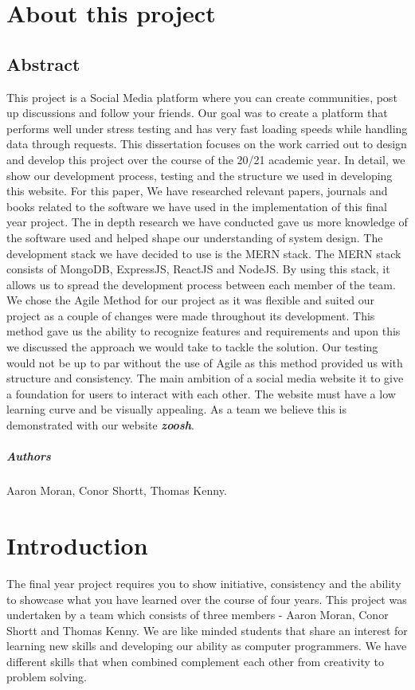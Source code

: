 
\chapter*{About this project}
\section{Abstract}
This project is a Social Media platform where you can create communities, post up discussions and follow your friends. Our goal was to create a platform that performs well under stress testing and has very fast loading speeds while handling data through requests.
This dissertation focuses on the work carried out to design and develop this project over the course of the 20/21 academic year. In detail, we show our development process, testing and the structure we used in developing this website. For this paper, We have researched relevant papers, journals and books related to the software we have used in the implementation of this final year project. The in depth research we have conducted gave us more knowledge of the software used and helped shape our understanding of system design. The development stack we have decided to use is the MERN stack. The MERN stack consists of MongoDB, ExpressJS, ReactJS and NodeJS. By using this stack, it allows us to spread the development process between each member of the team. We chose the Agile Method for our project as it was flexible and suited our project as a couple of changes were made throughout its development. This method gave us the ability to recognize features and requirements and upon this we discussed the approach we would take to tackle the solution. Our testing would not be up to par without the use of Agile as this method provided us with structure and consistency. 
The main ambition of a social media website it to give a foundation for users to interact with each other. The website must have a low learning curve and be visually appealing. As a team we believe this is demonstrated with our website \textbf{\textit{zoosh}}.

\paragraph{Authors}
Aaron Moran, Conor Shortt, Thomas Kenny.

\chapter{Introduction}
The final year project requires you to show initiative, consistency and the ability to showcase what you have learned over the course of four years.
This project was undertaken by a team which consists of three members - Aaron Moran, Conor Shortt and Thomas Kenny. We are like minded students that share an interest for learning new skills and developing our ability as computer programmers. We have different skills that when combined complement each other from creativity to problem solving. 
\newline

